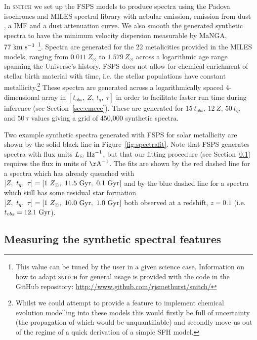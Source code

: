 \documentclass[useAMS,usenatbib]{mn2e}
\begin{document}
In \textsc{snitch} we set up the FSPS models to produce spectra using the Padova isochrones \citep{girardi02} and MILES spectral library \citep{vazdekis16} with nebular emission, emission from dust \cite{draineli07}, a \cite{chabrier03} IMF and a \cite{calzetti00} dust attenuation curve. We also smooth the generated synthetic spectra to have the minimum velocity dispersion measurable by MaNGA, $77~\rm{km}~{s}^{-1}$ \citep{bundy15}\footnote{This value can be tuned by the user in a given science case. Information on how to adapt \textsc{snitch} for general usage is provided with the code in the GitHub repository: \url{http://www.github.com/rjsmethurst/snitch/}}. Spectra are generated for the 22 metalicities provided in the MILES models, ranging from $0.011~Z_{\odot}$ to $1.579~Z_{\odot}$ across a logarithmic age range spanning the Universe's history. FSPS does not allow for chemical enrichment of stellar birth material with time, i.e. the stellar populations have constant metallicity.\footnote{Whilst we could attempt to provide a feature to implement chemical evolution modelling into these models this would firstly be full of uncertainty (the propagation of which would be unquantifiable) and secondly move us out of the regime of a quick derivation of a simple SFH model.} These spectra are generated across a logarithmically spaced 4-dimensional array in $[t_{obs},~Z,~t_q,~\tau]$ in order to facilitate faster run time during inference (see Section~\ref{sec:emcee}). These are generated for $15~t_{obs}$, $12~Z$, $50~t_q$, and $50~\tau$ values giving a grid of 450,000 synthetic spectra.

Two example synthetic spectra generated with FSPS for solar metallicity are shown by the solid black line in Figure~\ref{fig:spectrafit}. Note that FSPS generates spectra with flux units $L_{\odot}~\rm{Hz}^{-1}$, but that our fitting procedure (see Section~\ref{sec:dap}) requires the flux in units of $\rm{\AA}^{-1}$. The fits are shown by the red dashed line for a spectra which has already quenched with $[Z,~t_q,~\tau] = [1~Z_{\odot},~11.5~\rm{Gyr},~0.1~\rm{Gyr}]$ and by the blue dashed line for a spectra which still has some residual star formation $[Z,~t_q,~\tau] = [1~Z_{\odot},~10.0~\rm{Gyr},~1.0~\rm{Gyr}]$ both observed at a redshift, $z=0.1$ (i.e. $t_{obs}=12.1~\rm{Gyr}$). 

\subsection{Measuring the synthetic spectral features}\label{sec:dap}
\end{document}
